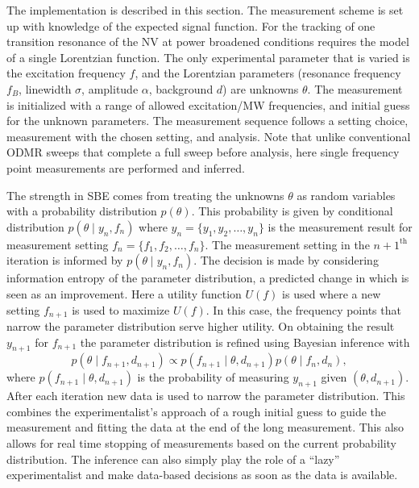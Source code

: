 The implementation is described in this section. The measurement scheme is set up with knowledge of the expected signal function. For the tracking of one transition resonance of the \gls{NV} at power broadened conditions\cite{dreauAvoidingPowerBroadening2011} requires the model of a single Lorentzian function. The only experimental parameter that is varied is the excitation frequency $f$, and the Lorentzian parameters (resonance frequency $f_B$, linewidth $\sigma$, amplitude $\alpha$, background $d$) are unknowns $\theta$. The measurement is initialized with a range of allowed excitation/\gls{MW} frequencies, and initial guess for the unknown parameters. The measurement sequence follows a setting choice, measurement with the chosen setting, and analysis. Note that unlike conventional \gls{ODMR} sweeps that complete a full sweep before analysis, here single frequency point measurements are performed and inferred.

The strength in \gls{SBE} comes from treating the unknowns $\theta$ as random variables with a probability distribution $p(\theta)$. This probability is given by conditional distribution $p(\theta \mid  y_n,f_n)$ where $y_n = \{ y_1,y_2,\dots,y_n\}$ is the measurement result for measurement setting $f_n = \{ f_1,f_2,\dots,f_n\}$. The measurement setting in the $n+1^{\text{th}}$ iteration is informed by $p(\theta \mid  y_n,f_n)$. The decision is made by considering information entropy of the parameter distribution, a predicted change in which is seen as an improvement. Here a utility function $U(f)$ is used where a new setting $f_{n+1}$ is used to maximize $U(f)$. In this case, the frequency points that narrow the parameter distribution serve higher utility. On obtaining the result $y_{n+1}$ for $f_{n+1}$ the parameter distribution is refined using Bayesian inference with
\begin{equation}
    p(\theta \mid f_{n+1}, d_{n+1}) \propto p(f_{n+1} \mid \theta, d_{n+1}) p(\theta \mid f_n, d_n),
\end{equation}
where $p(f_{n+1} \mid \theta, d_{n+1})$ is the probability of measuring $y_{n+1}$ given $(\theta, d_{n+1})$. After each iteration new data is used to narrow the parameter distribution. This combines the experimentalist's approach of a rough initial guess to guide the measurement and fitting the data at the end of the long measurement. This also allows for real time stopping of measurements based on the current probability distribution\cite{dushenkoSequentialBayesianExperiment2020}. The inference can also simply play the role of a ``lazy'' experimentalist and make data-based decisions as soon as the data is available.

